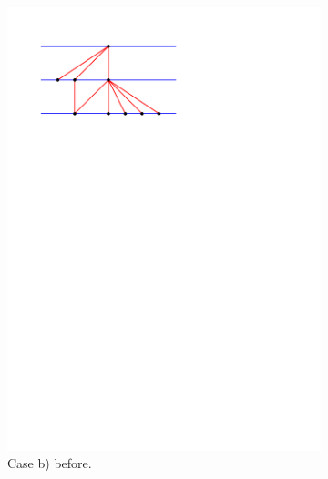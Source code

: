 \begin{figure}[!b]
    \begin{subfigure}[t]{0.45 \textwidth}
        \includegraphics[width = \textwidth]{topFanFlips/img/newFlip/bBefore}
        \caption{Case b) before.}
    \end{subfigure}
    ~
    \begin{subfigure}[t]{0.45 \textwidth}

\end{subfigure}
\end{figure}
